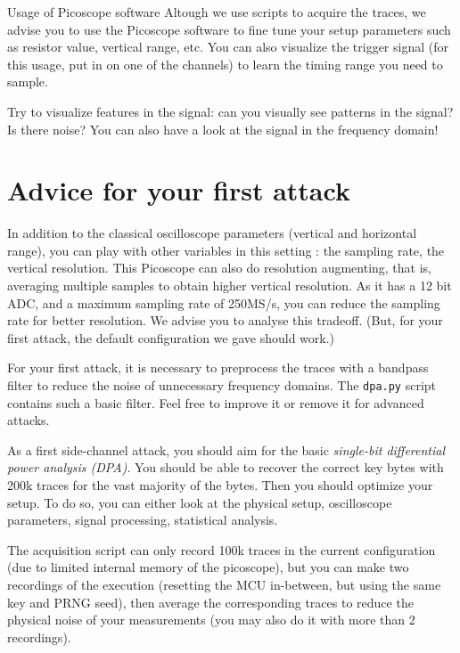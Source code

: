 \begin{bclogo}[couleur = gray!20, arrondi = 0.2, logo=\bcinfo]{Usage of Picoscope software}
Altough we use scripts to acquire the traces, we advise you to use the Picoscope software to fine tune your setup parameters such as resistor value, vertical range, etc. You can also visualize the trigger signal (for this usage, put in on one of the channels) to learn the timing range you need to sample.

Try to visualize features in the signal: can you visually see patterns in the signal? Is there noise? You can also have a look at the signal in the frequency domain!
\end{bclogo}

\section{Advice for your first attack}
In addition to the classical oscilloscope parameters (vertical and horizontal range), you can play with other variables in this setting : the sampling rate, the vertical resolution. This Picoscope can also do resolution augmenting, that is, averaging multiple samples to obtain higher vertical resolution. As it has a 12 bit ADC, and a maximum sampling rate of 250MS/s, you can reduce the sampling rate for better resolution. We advise you to analyse this tradeoff. (But, for your first attack, the default configuration we gave should work.)

For your first attack, it is necessary to preprocess the traces with a bandpass filter to reduce the noise of unnecessary frequency domains. The \texttt{dpa.py} script contains such a basic filter. Feel free to improve it or remove it for advanced attacks.

As a first side-channel attack, you should aim for the basic \textit{single-bit differential power analysis (DPA)}. You should be able to recover the correct key bytes with 200k traces for the vast majority of the bytes. Then you should optimize your setup. To do so, you can either look at the physical setup, oscilloscope parameters, signal processing, statistical analysis.

The acquisition script can only record 100k traces in the current configuration (due to limited internal memory of the picoscope), but you can make two recordings of the execution (resetting the MCU in-between, but using the same key and PRNG seed), then average the corresponding traces to reduce the physical noise of your measurements (you may also do it with more than 2 recordings).

